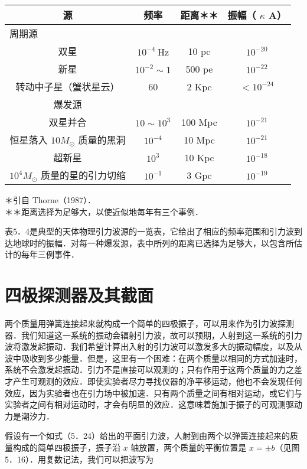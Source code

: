 \begin{center}
	\begin{tabular}{|c|c|c|c|}
		\hline
		源 & 频率 & 距离＊＊ & 振幅（ $\kappa$ A） \\
		\hline
		\multicolumn{4}{|l|}{周期源} \\
		\hline
		双星 & $10^{-4} \mathrm{~Hz}$ & 10 pc & $10^{-20}$ \\
		\hline
		新星 & $10^{-2} \sim 1$ & 500 pe & $10^{-22}$ \\
		\hline
		转动中子星（蟹状星云） & 60 & 2 Kpc & $<10^{-24}$ \\
		\hline
		爆发源 &  &  &  \\
		\hline
		双星并合 & $10 \sim 10^{3}$ & 100 Mpc & $10^{-21}$ \\
		\hline
		恒星落入 $10 M_{\odot}$ 质量的黑洞 & $10^{-4}$ & 10 Mpc & $10^{-21}$ \\
		\hline
		超新星 & $10^{3}$ & 10 Kpc & $10^{-18}$ \\
		\hline
		$10^{4} M_{\odot}$ 质量的星的引力切缩 & $10^{-1}$ & 3 Gpc & $10^{-19}$ \\
		\hline
	\end{tabular}
\end{center}

＊引自 Thorne（1987）．\\
＊＊距离选择为足够大，以使近似地每年有三个事例．

表5．4是典型的天体物理引力波源的一览表，它给出了相应的频率范围和引力波到达地球时的振幅．对每一种爆发源，表中所列的距离已选择为足够大，以包含所估计的每年三例事件．

\section{四极探测器及其截面}
两个质量用弹簧连接起来就构成一个简单的四极振子，可以用来作为引力波探测器．我们知道这一系统的振动会辐射引力波，故可以预期，人射到这一系统的引力波将激发起振动．我们希望计算出入射的引力波可以激发多大的振动幅度，以及从波中吸收到多少能量．但是，这里有一个困难：在两个质量以相同的方式加速时，系统不会激发起振动．引力不是直接可以观测的；只有作用于这两个质量的力之差才产生可观测的效应．即使实验者尽力寻找仪器的净平移运动，他也不会发现任何效应，因为实验者也在引力场中被加速．只有两个质量之间有相对运动，或它们与实验者之间有相对运动时，才会有明显的效应．这意味着施加于振子的可观测驱动力是潮汐力．

假设有一个如式（5．24）给出的平面引力波，人射到由两个以弹簧连接起来的质量构成的简单四极振子，振子沿 $x$ 轴放置，两个质量的平衡位置是 $x= \pm b$（见图 5．16）．用复数记法，我们可以把波写为


